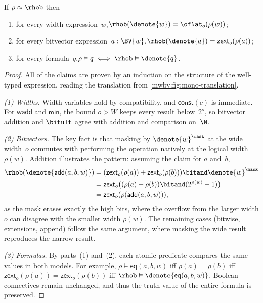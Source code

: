 \begin{lemma}[Correspondence]\label{mwbv:lem:correspondence}
If $\rho \approx \rhob$ then
\begin{enumerate}
  \item for every width expression~$w$,\quad $\rhob(\denote{w}) = \ofNat_o(\rho(w))$;
  \item for every bitvector expression~$a : \BV{w}$,\quad $\rhob(\denote{a}) = \mathsf{zext}_o(\rho(a))$;
  \item for every formula~$q$,\quad $\rho \vDash q \iff \rhob \vDash \denote{q}$.
\end{enumerate}
\end{lemma}
\begin{proof}
All of the claims are proven by an induction on the structure of the well-typed expression,
reading the translation from \cref{mwbv:fig:mono-translation}.

\emph{(1) Widths.} Width variables hold by compatibility, and
$\textsf{const}(c)$ is immediate. For $\textsf{wadd}$ and $\textsf{min}$, the
bound $o > W$ keeps every result below~$2^o$, so bitvector addition and
$\bitult$ agree with addition and comparison on~$\N$.

\emph{(2) Bitvectors.} The key fact is that masking by $\denote{w}^\mask$ at the
wide width~$o$ commutes with performing the operation natively at the logical
width~$\rho(w)$. Addition illustrates the pattern: assuming the claim for $a$
and~$b$,
\noindent
\begin{align*}
  \rhob(\denote{\textsf{add}(a,b,w)}) &= (\mathsf{zext}_o(\rho(a)) + \mathsf{zext}_o(\rho(b))) \bitand \denote{w}^\mask \\
  &= \mathsf{zext}_o\big((\rho(a) + \rho(b)) \bitand (2^{\rho(w)} - 1)\big) \\
  &= \mathsf{zext}_o(\rho(\textsf{add}(a,b,w))),
\end{align*}
as the mask erases exactly the high bits, where the overflow from the larger width $o$
can disagree with the smaller width $\rho(w)$. The remaining cases (bitwise, extensions, append)
follow the same argument, where masking the wide result reproduces the narrow result.

\emph{(3) Formulas.} By parts~(1) and~(2), each atomic predicate compares the
same values in both models. For example, $\rho \vDash \textsf{eq}(a,b,w)$ iff
$\rho(a) = \rho(b)$ iff $\mathsf{zext}_o(\rho(a)) = \mathsf{zext}_o(\rho(b))$ iff
$\rhob \vDash \denote{\textsf{eq}(a,b,w)}$. Boolean connectives
remain unchanged, and thus the truth value of the entire formula is preserved.
\end{proof}

